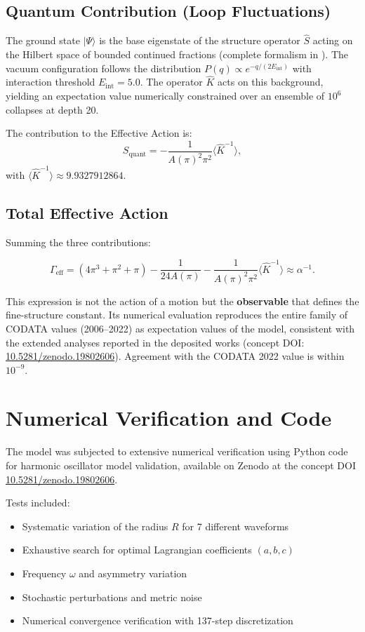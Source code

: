 \documentclass[12pt]{article}
\begin{document}
\subsection{Quantum Contribution (Loop Fluctuations)}

The ground state $|\Psi\rangle$ is the base eigenstate of the structure operator $\hat S$ acting on the Hilbert space of bounded continued fractions (complete formalism in \cite{blandino2026b}). The vacuum configuration follows the distribution $P(q) \propto e^{-q/(2E_{\text{int}})}$ with interaction threshold $E_{\text{int}} = 5.0$. The operator $\hat K$ acts on this background, yielding an expectation value numerically constrained over an ensemble of $10^6$ collapses at depth 20.

The contribution to the Effective Action is:
\[
S_{\text{quant}} = -\frac{1}{A(\pi)^2 \pi^2} \langle \hat K^{-1} \rangle,
\]
with $\langle \hat K^{-1} \rangle \approx 9.9327912864$.

\subsection{Total Effective Action}

Summing the three contributions:

\[
\Gamma_{\text{eff}} = (4\pi^3 + \pi^2 + \pi) - \frac{1}{24A(\pi)} - \frac{1}{A(\pi)^2 \pi^2} \langle \hat K^{-1} \rangle \approx \alpha^{-1}.
\]

This expression is not the action of a motion but the \textbf{observable} that defines the fine-structure constant. Its numerical evaluation reproduces the entire family of CODATA values (2006–2022) as expectation values of the model, consistent with the extended analyses reported in the deposited works (concept DOI: \href{https://doi.org/10.5281/zenodo.19802606}{10.5281/zenodo.19802606}). Agreement with the CODATA 2022 value is within $10^{-9}$.

\section{Numerical Verification and Code}

The model was subjected to extensive numerical verification using Python code for harmonic oscillator model validation, available on Zenodo at the concept DOI \href{https://doi.org/10.5281/zenodo.19802606}{10.5281/zenodo.19802606}.

Tests included:
\begin{itemize}
    \item Systematic variation of the radius $R$ for 7 different waveforms
    \item Exhaustive search for optimal Lagrangian coefficients $(a,b,c)$
    \item Frequency $\omega$ and asymmetry variation
    \item Stochastic perturbations and metric noise
    \item Numerical convergence verification with 137-step discretization
\end{itemize}
\end{document}
